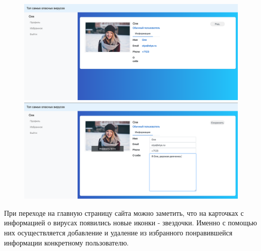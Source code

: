 \documentclass[a4paper,14pt]{extarticle}
\begin{document}
 	\begin{figure}[h!]
 		\begin{minipage}[b]{0.45\textwidth}
 			\includegraphics[width=\textwidth]{examples/profile.png}
 		\end{minipage}
 		\begin{minipage}[b]{0.45\textwidth}
 			\includegraphics[width=\textwidth]{examples/edit_profile.png}
 		\end{minipage}
 		\label{ris:profile_edit_profile}
 	\end{figure}
 
 
 	При переходе на главную страницу сайта можно заметить, что на карточках с информацией о вирусах появились новые иконки - звездочки. Именно с помощью них осуществляется добавление и удаление из избранного понравившейся информации конкретному пользователю.
 
\end{document}
